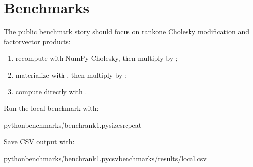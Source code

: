 \documentclass[a4paper,11pt,english]{sphinxmanual}
\begin{document}
\chapter{Benchmarks}
\label{\detokenize{benchmarks:benchmarks}}\label{\detokenize{benchmarks::doc}}
\sphinxAtStartPar
The public benchmark story should focus on rank\sphinxhyphen{}one Cholesky modification and
factor\sphinxhyphen{}vector products:
\begin{enumerate}
%
\item {} 
\sphinxAtStartPar
recompute  with NumPy Cholesky, then multiply by ;

\item {} 
\sphinxAtStartPar
materialize  with , then multiply by ;

\item {} 
\sphinxAtStartPar
compute  directly with .

\end{enumerate}

\sphinxAtStartPar
Run the local benchmark with:

\begin{sphinxVerbatim}[commandchars=\\\{\}]
pythonbenchmarks/bench\PYGZus{}rank1.py\PYGZhy{}\PYGZhy{}sizes\PYGZhy{}\PYGZhy{}repeat
\end{sphinxVerbatim}

\sphinxAtStartPar
Save CSV output with:

\begin{sphinxVerbatim}[commandchars=\\\{\}]
pythonbenchmarks/bench\PYGZus{}rank1.py\PYGZhy{}\PYGZhy{}csvbenchmarks/results/local.csv
\end{sphinxVerbatim}
\end{document}
